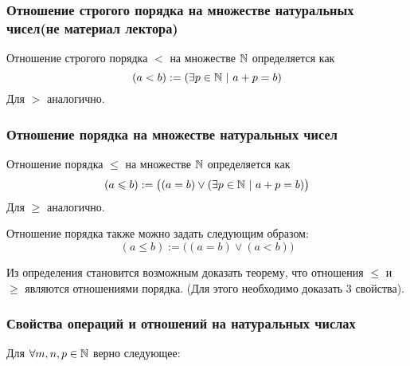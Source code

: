 \subsubsection*{Отношение строгого порядка на множестве натуральных чисел(не материал лектора)}

\begin{definition}
    Отношение строгого порядка $<$ на множестве $\mathbb{N}$ определяется как
    \[
        (a < b) := (\exists p \in \mathbb{N}\ |\ a + p = b)
    \]
    Для $>$ аналогично.
\end{definition}

\subsubsection*{Отношение порядка на множестве натуральных чисел}

\begin{definition}
	Отношение порядка $\le$ на множестве $\mathbb{N}$ определяется как
	\[
		(a \leqslant b) := \big((a = b) \vee (\exists p \in \mathbb{N}\ |\ a + p = b)\big)
	\]
	Для $\ge$ аналогично.
\end{definition}

\begin{anote}
    Отношение порядка также можно задать следующим образом:
    \[
    	(a \le b) := \big((a = b) \vee (a < b)\big)
    \]
\end{anote}

Из определения становится возможным доказать теорему, что отношения $\le$ и $\ge$ являются отношениями порядка. (Для этого необходимо доказать 3 свойства).

\subsubsection*{Свойства операций и отношений на натуральных числах}

Для $\forall m, n, p \in \mathbb{N}$ верно следующее:

